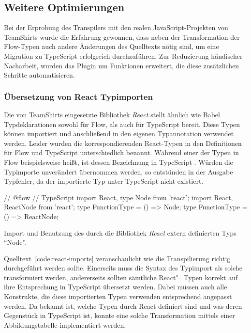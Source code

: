 \bigbreak


\subsection{Weitere Optimierungen}
\label{subsec:optimizations}

Bei der Erprobung des Transpilers mit den realen JavaScript-Projekten von TeamShirts wurde die Erfahrung gewonnen, dass neben der Transformation der Flow-Typen auch andere Änderungen des Quelltexts nötig sind, um eine Migration zu TypeScript erfolgreich durchzuführen. Zur Reduzierung händischer Nacharbeit, wurden das Plugin um Funktionen erweitert, die diese zusätzlichen Schritte automatisieren.

\subsubsection{Übersetzung von React Typimporten}
\label{subsec:react-type-import-mapping}

Die von TeamShirts eingesetzte Bibliothek \textit{React} stellt ähnlich wie Babel Typdeklarationen sowohl für Flow, als auch für TypeScript bereit. Diese Typen können importiert und anschließend in den eigenen Typannotation verwendet werden. Leider wurden die korrespondierenden React-Typen in den Definitionen für Flow und TypeScript unterschiedlich benannt. Während einer der Typen in Flow beispielsweise  heißt, ist dessen Bezeichnung in TypeScript . Würden die Typimporte unverändert übernommen werden, so entstünden in der Ausgabe Typfehler, da der importierte Typ unter TypeScript nicht existiert.

\bigbreak
\begin{listing}[htb]
\begin{textcode}
// @flow                                        // TypeScript
import React, { type Node } from 'react';       import React, { ReactNode } from 'react';
type FunctionType = () => Node;                 type FunctionType = () => ReactNode;
\end{textcode}
\listingvspace
\caption{Import und Benutzung des durch die Bibliothek \textit{React} extern definierten Typs \enquote{Node}.}
\label{code:react-imports}
\end{listing}

Quelltext~\ref{code:react-imports} veranschaulicht wie die Transpilierung richtig durchgeführt werden sollte. Einerseits muss die Syntax des Typimport als solche transformiert werden, andererseits sollten sämtliche React"=Typen korrekt auf ihre Entsprechung in TypeScript übersetzt werden. Dabei müssen auch alle Konstrukte, die diese importierten Typen verwenden entsprechend angepasst werden. Da bekannt ist, welche Typen durch React definiert sind und was deren Gegenstück in TypeScript ist, konnte eine solche Transformation mittels einer Abbildungstabelle implementiert werden.

